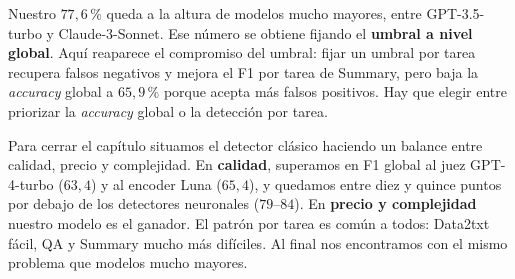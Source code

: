 \documentclass[12pt,a4paper]{report}
\theoremstyle{definition}
\begin{document}
Nuestro $77{,}6\,\%$ queda a la altura de
modelos mucho mayores, entre GPT-3.5-turbo y Claude-3-Sonnet. Ese número se obtiene fijando el \textbf{umbral a nivel global}. Aquí reaparece el compromiso del umbral: fijar un
umbral por tarea recupera falsos negativos y mejora el F1 por tarea de Summary,
pero baja la \emph{accuracy} global a $65{,}9\,\%$ porque acepta más falsos positivos. Hay que elegir entre priorizar la \emph{accuracy} global o la detección por tarea.


Para cerrar el capítulo situamos el detector clásico haciendo un balance entre calidad, precio y complejidad. En \textbf{calidad}, superamos en F1
global al juez GPT-4-turbo ($63{,}4$) y al encoder Luna ($65{,}4$), y quedamos entre diez y
quince puntos por debajo de los detectores neuronales ($79$--$84$). En \textbf{precio
y complejidad} nuestro modelo es el ganador. El patrón por tarea
es común a todos: Data2txt fácil, QA y Summary mucho más difíciles. Al final nos encontramos con el mismo problema que modelos mucho mayores.



\end{document}
